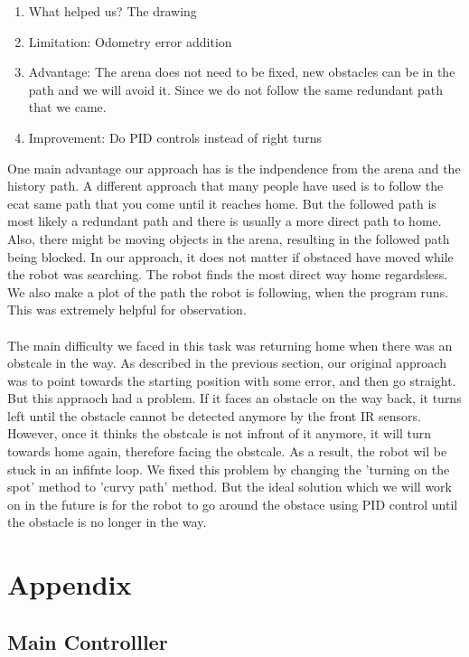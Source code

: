 \documentclass[]{article}
\begin{document}
\begin{enumerate}
 \item What helped us? The drawing
 \item Limitation: Odometry error addition 
 \item Advantage: The arena does not need to be fixed, new obstacles can be in the path and we will avoid it. Since we do not follow the same redundant path that we came.
 \item Improvement: Do PID controls instead of right turns
\end{enumerate}


One main advantage our approach has is the indpendence from the arena and the history path. A different approach that many people have used is to follow the ecat same path that you come until it reaches home. But the followed path is most likely a redundant path and there is usually a more direct path to home. Also, there might be moving objects in the arena, resulting in the followed path being blocked. In our approach, it does not matter if obstaced have moved while the robot was searching. The robot finds the most direct way home regardsless. We also make a plot of the path the robot is following, when the program runs. This was extremely helpful for observation.\\\\
The main difficulty we faced in this task was returning home when there was an obstcale in the way. As described in the previous section, our original approach was to point towards the starting position with some error, and then go straight. But this appraoch had a problem. If it faces an obstacle on the way back, it turns left until the obstacle cannot be detected anymore by the front IR sensors. However, once it thinks the obstcale is not infront of it anymore, it will turn towards home again, therefore facing the obstcale. As a result, the robot wil be stuck in an infifnte loop. We fixed this problem by changing the 'turning on the spot' method to 'curvy path' method. But the ideal solution which we will work on in the future is for the robot to go around the obstace using PID control until the obstacle is no longer in the way.  



\section{Appendix}
\subsection{Main Controlller}
\end{document}

